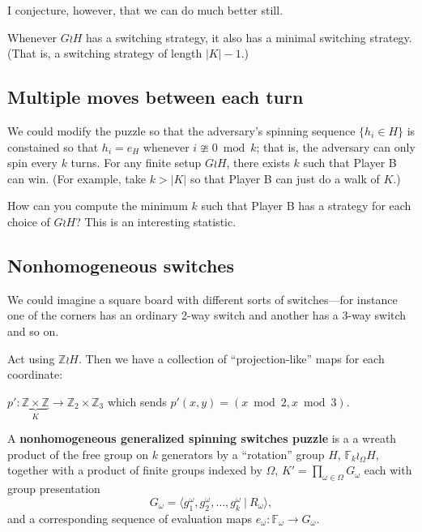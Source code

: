 I conjecture, however, that we can do much better still.

\begin{conjecture}
  Whenever $G \wr H$ has a switching strategy, it also has a minimal switching
  strategy. (That is, a switching strategy of length $|K| - 1$.)
\end{conjecture}

\subsection{Multiple moves between each turn}
We could modify the puzzle so that the adversary's spinning sequence
$\{h_i \in H\}$ is constained so that $h_i = e_H$ whenever $i \ncong 0 \bmod k$;
that is, the adversary can only spin every $k$ turns. For any finite setup
$G \wr H$, there exists $k$ such that Player B can win.
(For example, take $k > |K|$ so that Player B can just do a walk of $K$.)

How can you compute the minimum $k$ such that Player B has a strategy for each
choice of $G \wr H$? This is an interesting statistic.

\subsection{Nonhomogeneous switches}
We could imagine a square board with different sorts of switches---for instance
one of the corners has an ordinary 2-way switch and another has a 3-way switch
and so on.

\begin{example}
  Act using $\mathbb {Z} \wr H$.
  Then we have a collection of ``projection-like'' maps for each coordinate:

  $p' \colon \underbrace{\mathbb Z \times \mathbb Z}_K \rightarrow \mathbb{Z}_2 \times \mathbb{Z}_3$
  which sends $p'(x, y) = (x \bmod 2, x \bmod 3)$.
\end{example}

\begin{definition}
  A \textbf{nonhomogeneous generalized spinning switches puzzle} is a
  a wreath product of the free group on $k$ generators by a ``rotation'' group
  $H$, \(
    \mathbb F_k \wr_\Omega H
  \),
  together with a product of finite groups indexed by $\Omega$,
  $K' = \prod_{\omega \in \Omega} G_\omega$
  each with group presentation \[
    G_\omega = \langle g^\omega_1, g^\omega_2, \dots, g^\omega_k\ |\ R_\omega\rangle,
  \]
  and a corresponding sequence of evaluation maps
  $e_\omega \colon \mathbb F_\omega \rightarrow G_\omega$.
\end{definition}

